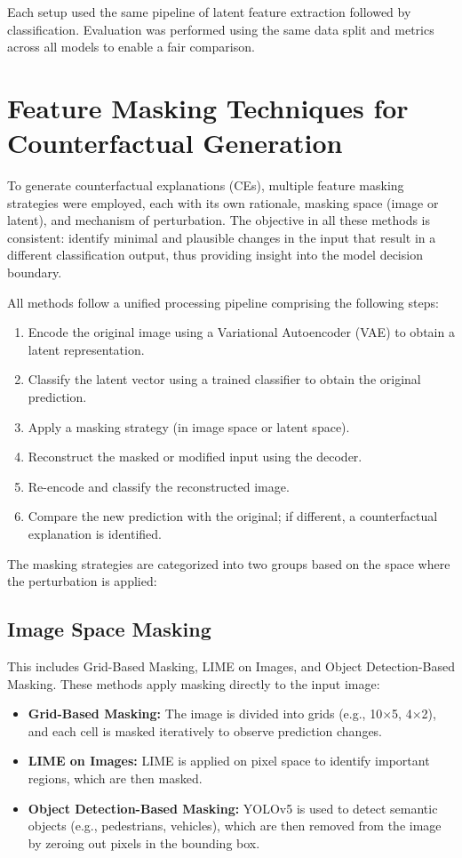 Each setup used the same pipeline of latent feature extraction followed by classification. Evaluation was performed using the same data split and metrics across all models to enable a fair comparison.


\section{Feature Masking Techniques for Counterfactual Generation}
\label{sec:feature_masking_pipeline}


To generate counterfactual explanations (CEs), multiple feature masking strategies were employed, each with its own rationale, masking space (image or latent), and mechanism of perturbation. The objective in all these methods is consistent: identify minimal and plausible changes in the input that result in a different classification output, thus providing insight into the model decision boundary.

All methods follow a unified processing pipeline comprising the following steps:
\begin{enumerate}
    \item Encode the original image using a Variational Autoencoder (VAE) to obtain a latent representation.
    \item Classify the latent vector using a trained classifier to obtain the original prediction.
    \item Apply a masking strategy (in image space or latent space).
    \item Reconstruct the masked or modified input using the decoder.
    \item Re-encode and classify the reconstructed image.
    \item Compare the new prediction with the original; if different, a counterfactual explanation is identified.
\end{enumerate}

The masking strategies are categorized into two groups based on the space where the perturbation is applied:

\subsection*{Image Space Masking}
This includes Grid-Based Masking, LIME on Images, and Object Detection-Based Masking. These methods apply masking directly to the input image:
\begin{itemize}
    \item \textbf{Grid-Based Masking:} The image is divided into grids (e.g., 10$\times$5, 4$\times$2), and each cell is masked iteratively to observe prediction changes.
    \item \textbf{LIME on Images:} LIME is applied on pixel space to identify important regions, which are then masked.
    \item \textbf{Object Detection-Based Masking:} YOLOv5 is used to detect semantic objects (e.g., pedestrians, vehicles), which are then removed from the image by zeroing out pixels in the bounding box.
\end{itemize}


